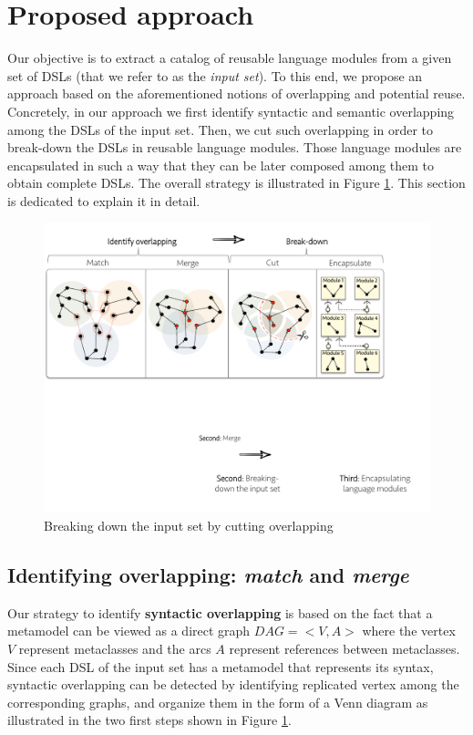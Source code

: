 \section{Proposed approach}
\label{sec:apprach}

Our objective is to extract a catalog of reusable language modules from a given set of DSLs (that we refer to as the \textit{input set}). To this end, we propose an approach based on the aforementioned notions of overlapping and potential reuse. Concretely, in our approach we first identify syntactic and semantic overlapping among the DSLs of the input set. Then, we cut such overlapping in order to break-down the DSLs in reusable language modules. Those language modules are encapsulated in such a way that they can be later composed among them to obtain complete DSLs. The overall strategy is illustrated in Figure \ref{fig:breakingdown}. This section is dedicated to explain it in detail.

\begin{figure}
\centering
\includegraphics[width=1\linewidth]{images/breakdown.pdf}
\caption{Breaking down the input set by cutting overlapping}
\label{fig:breakingdown}
\end{figure}

\subsection{Identifying overlapping: \textit{match} and \textit{merge}}
\label{sec:identifyingoverlapping}

Our strategy to identify \textbf{syntactic overlapping} is based on the fact that a metamodel can be viewed as a direct graph $DAG=<V,A>$ where the vertex $V$ represent metaclasses and the arcs $A$ represent references between metaclasses. Since each DSL of the input set has a metamodel that represents its syntax, syntactic overlapping can be detected by identifying replicated vertex among the corresponding graphs, and organize them in the form of a Venn diagram as illustrated in the two first steps shown in Figure \ref{fig:breakingdown}.

